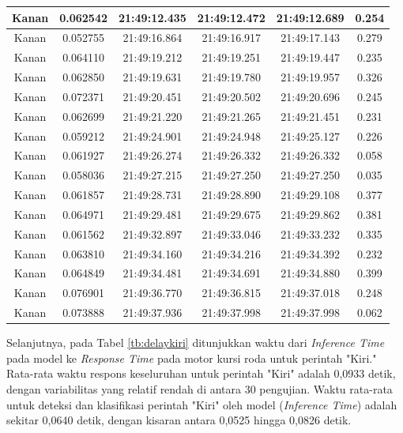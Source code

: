 \begin{longtable}{|c|c|c|c|c|c|}
      Kanan & 0.062542 & 21:49:12.435 & 21:49:12.472 & 21:49:12.689 & 0.254 \\ \hline
      Kanan & 0.052755 & 21:49:16.864 & 21:49:16.917 & 21:49:17.143 & 0.279 \\ \hline
      Kanan & 0.064110 & 21:49:19.212 & 21:49:19.251 & 21:49:19.447 & 0.235 \\ \hline
      Kanan & 0.062850 & 21:49:19.631 & 21:49:19.780 & 21:49:19.957 & 0.326 \\ \hline
      Kanan & 0.072371  & 21:49:20.451 & 21:49:20.502 & 21:49:20.696 & 0.245 \\ \hline
      Kanan & 0.062699 & 21:49:21.220 & 21:49:21.265 & 21:49:21.451 & 0.231 \\ \hline
      Kanan & 0.059212 & 21:49:24.901 & 21:49:24.948 & 21:49:25.127 & 0.226 \\ \hline
      Kanan & 0.061927 & 21:49:26.274 & 21:49:26.332 & 21:49:26.332 & 0.058 \\ \hline
      Kanan & 0.058036 & 21:49:27.215 & 21:49:27.250 & 21:49:27.250 & 0.035 \\ \hline
      Kanan & 0.061857 & 21:49:28.731 & 21:49:28.890 & 21:49:29.108 & 0.377 \\ \hline
      Kanan & 0.064971 & 21:49:29.481 & 21:49:29.675 & 21:49:29.862 & 0.381 \\ \hline
      Kanan & 0.061562 & 21:49:32.897 & 21:49:33.046 & 21:49:33.232 & 0.335 \\ \hline
      Kanan & 0.063810 & 21:49:34.160 & 21:49:34.216 & 21:49:34.392 & 0.232 \\ \hline
      Kanan & 0.064849 & 21:49:34.481 & 21:49:34.691 & 21:49:34.880 & 0.399 \\ \hline
      Kanan & 0.076901 & 21:49:36.770 & 21:49:36.815 & 21:49:37.018 & 0.248 \\ \hline
      Kanan & 0.073888 & 21:49:37.936 & 21:49:37.998 & 21:49:37.998 & 0.062 \\ \hline
\end{longtable}

Selanjutnya, pada Tabel \ref{tb:delaykiri} ditunjukkan waktu dari \emph{Inference Time} pada model ke \emph{Response Time} pada motor kursi roda untuk perintah "Kiri." Rata-rata waktu respons keseluruhan untuk perintah "Kiri" adalah 0,0933 detik, dengan variabilitas yang relatif rendah di antara 30 pengujian. Waktu rata-rata untuk deteksi dan klasifikasi perintah "Kiri" oleh model (\emph{Inference Time}) adalah sekitar 0,0640 detik, dengan kisaran antara 0,0525 hingga 0,0826 detik.

